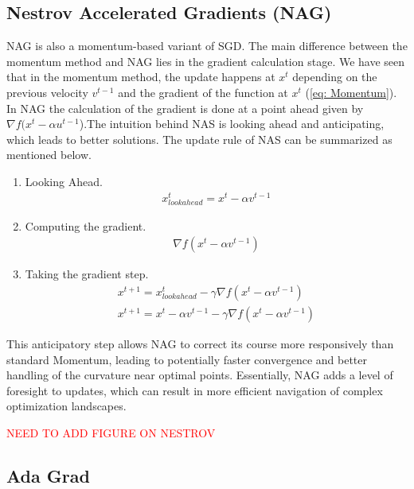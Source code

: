 \subsection{Nestrov Accelerated Gradients (NAG)}

NAG is also a momentum-based variant of SGD. The main difference between the momentum method and NAG lies in the gradient calculation stage. We have seen that in the momentum method, the update happens at $x^t$ depending on the previous velocity $v^{t-1}$ and the gradient of the function at $x^{t}$ (\ref{eq: Momentum}). In NAG the calculation of the gradient is done at a point ahead given by $\nabla f(x^{t} - \alpha u^{t-1}$).The intuition behind NAS is looking ahead and anticipating, which leads to better solutions. The update rule of NAS can be summarized as mentioned below.

\begin{enumerate}
    \item Looking Ahead. 
        \begin{align}
            x^{t}_{look ahead} = x^t - \alpha v^{t-1}
        \end{align} 
    \item Computing the gradient. 
        \begin{align}
            \nabla f( x^t - \alpha v^{t-1})
        \end{align}
    \item Taking the gradient step.
    \begin{align}
         \nonumber x^{t+1} = x^{t}_{look ahead} - \gamma \nabla f( x^t - \alpha v^{t-1})\\
         x^{t+1} = x^t - \alpha v^{t-1} - \gamma \nabla f( x^t - \alpha v^{t-1})
    \end{align}
\end{enumerate}

This anticipatory step allows NAG to correct its course more responsively than standard Momentum, leading to potentially faster convergence and better handling of the curvature near optimal points. Essentially, NAG adds a level of foresight to updates, which can result in more efficient navigation of complex optimization landscapes.

\textcolor{red}{NEED TO ADD FIGURE ON NESTROV}



\subsection{Ada Grad}

